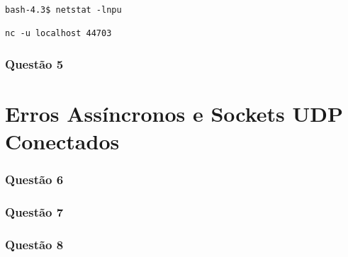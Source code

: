 \documentclass[a4paper,10pt]{article}
\begin{document}
\begin{lstlisting}
bash-4.3$ netstat -lnpu

nc -u localhost 44703
\end{lstlisting}




\section{Questão 5}


\part{Erros Assíncronos e Sockets UDP Conectados}
\section{Questão 6}


\section{Questão 7}


\section{Questão 8}
\end{document}
